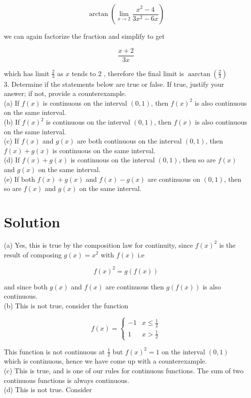 \documentclass[10pt]{article}
\begin{document}
$$
\arctan \left(\lim _{x \rightarrow 2} \frac{x^{2}-4}{3 x^{2}-6 x}\right)
$$

we can again factorize the fraction and simplify to get

$$
\frac{x+2}{3 x}
$$

which has limit $\frac{2}{3}$ as $x$ tends to 2 , therefore the final limit is $\operatorname{aarctan}\left(\frac{2}{3}\right)$\\
3. Determine if the statements below are true or false. If true, justify your answer; if not, provide a counterexample.\\
(a) If $f(x)$ is continuous on the interval $(0,1)$, then $f(x)^{2}$ is also continuous on the same interval.\\
(b) If $f(x)^{2}$ is continuous on the interval $(0,1)$, then $f(x)$ is also continuous on the same interval.\\
(c) If $f(x)$ and $g(x)$ are both continuous on the interval $(0,1)$, then $f(x)+g(x)$ is continuous on the same interval.\\
(d) If $f(x)+g(x)$ is continuous on the interval $(0,1)$, then so are $f(x)$ and $g(x)$ on the same interval.\\
(e) If both $f(x)+g(x)$ and $f(x)-g(x)$ are continuous on $(0,1)$, then so are $f(x)$ and $g(x)$ on the same interval.

\section*{Solution}
(a) Yes, this is true by the composition law for continuity, since $f(x)^{2}$ is the result of composing $g(x)=x^{2}$ with $f(x)$ i.e

$$
f(x)^{2}=g(f(x))
$$

and since both $g(x)$ and $f(x)$ are continuous then $g(f(x))$ is also continuous.\\
(b) This is not true, consider the function

$$
f(x)= \begin{cases}-1 & x \leq \frac{1}{2} \\ 1 & x>\frac{1}{2}\end{cases}
$$

This function is not continuous at $\frac{1}{2}$ but $f(x)^{2}=1$ on the interval $(0,1)$ which is continuous, hence we have come up with a counterexample.\\
(c) This is true, and is one of our rules for continuous functions. The sum of two continuous functions is always continuous.\\
(d) This is not true. Consider
\end{document}
